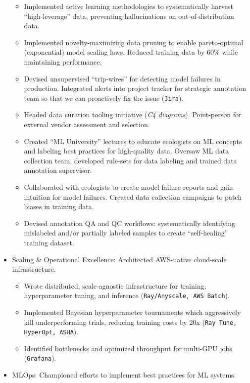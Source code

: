 \documentclass[a4paper,12pt]{article}
\begin{document}
\begin{itemize}
\begin{itemize}
            \item Implemented active learning methodologies to systematically harvest ``high-leverage'' data, preventing hallucinations on out-of-distribution data.
            \item Implemented novelty-maximizing data pruning to enable pareto-optimal (exponential) model scaling laws. Reduced training data by 60\% while maintaining performance.
            \item Devised unsupervised ``trip-wires'' for detecting model failures in production. Integrated alerts into project tracker for strategic annotation team so that we can proactively fix the issue (\texttt{Jira}).
            \item Headed data curation tooling initiative (\textit{C4 diagrams}). Point-person for external vendor assessment and selection.
            \item Created ``ML University'' lectures to educate ecologists on ML concepts and labeling best practices for high-quality data. Oversaw ML data collection team, developed rule-sets for data labeling and trained data annotation supervisor.
            \item Collaborated with ecologists to create model failure reports and gain intuition for model failures. Created data collection campaigns to patch biases in training data.
            \item Devised annotation QA and QC workflows: systematically identifying mislabeled and/or partially labeled samples to create ``self-healing'' training dataset.
        \end{itemize}
        \item Scaling \& Operational Excellence: Architected AWS-native cloud-scale infrastructure.
        \begin{itemize}
            \item Wrote distributed, scale-agnostic infrastructure for training, hyperparameter tuning, and inference (\texttt{Ray/Anyscale, AWS Batch}).
            \item Implemented Bayesian hyperparameter tournaments which aggressively kill underperforming trials, reducing training costs by 20x (\texttt{Ray Tune, HyperOpt, ASHA}).
            \item Identified bottlenecks and optimized throughput for multi-GPU jobs (\texttt{Grafana}).
        \end{itemize}
        \item MLOps: Championed efforts to implement best practices for ML systems.

\end{itemize}
\end{document}
